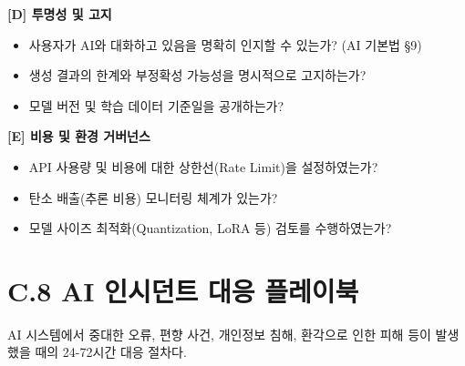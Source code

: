 \begin{tcolorbox}[colback=orange!5, colframe=orange!60, title={[Template C.7] LLM/GenAI 특화 거버넌스 체크리스트}]
\textbf{[D] 투명성 및 고지}
\begin{itemize}
    \item[$\square$] 사용자가 AI와 대화하고 있음을 명확히 인지할 수 있는가? (AI 기본법 §9)
    \item[$\square$] 생성 결과의 한계와 부정확성 가능성을 명시적으로 고지하는가?
    \item[$\square$] 모델 버전 및 학습 데이터 기준일을 공개하는가?
\end{itemize}

\textbf{[E] 비용 및 환경 거버넌스}
\begin{itemize}
    \item[$\square$] API 사용량 및 비용에 대한 상한선(Rate Limit)을 설정하였는가?
    \item[$\square$] 탄소 배출(추론 비용) 모니터링 체계가 있는가?
    \item[$\square$] 모델 사이즈 최적화(Quantization, LoRA 등) 검토를 수행하였는가?
\end{itemize}
\end{tcolorbox}

\section*{C.8 AI 인시던트 대응 플레이북}

AI 시스템에서 중대한 오류, 편향 사건, 개인정보 침해, 환각으로 인한 피해 등이 발생했을 때의 24-72시간 대응 절차다.

